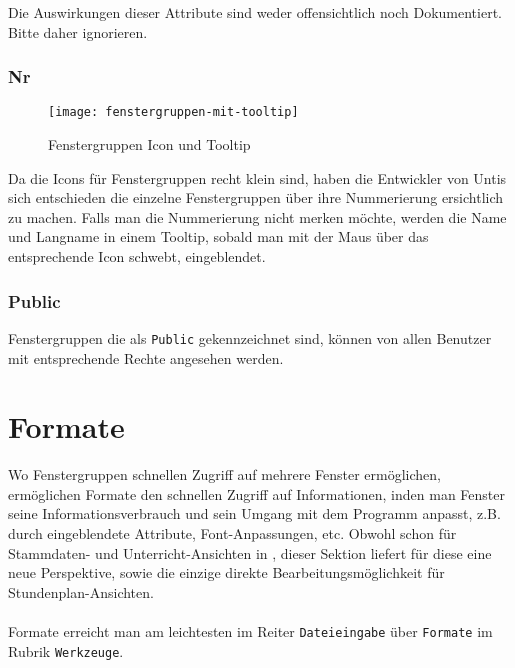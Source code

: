 Die Auswirkungen dieser Attribute sind weder offensichtlich noch Dokumentiert. Bitte daher ignorieren.

\subsubsection{Nr}

\begin{wrapfigure}{r}{.4\textwidth}
	\vspace{-14pt}
	\texttt{[image: fenstergruppen-mit-tooltip]}
	\vspace{-5pt}
	\caption{Fenstergruppen Icon und Tooltip}
	\label{fig:fenstergruppen-mit-tooltip}
	\vspace{-24pt}
\end{wrapfigure}

Da die Icons für Fenstergruppen recht klein sind, haben die Entwickler von Untis sich entschieden die einzelne Fenstergruppen über ihre Nummerierung ersichtlich zu machen. Falls man die Nummerierung nicht merken möchte, werden die Name und Langname in einem Tooltip, sobald man mit der Maus über das entsprechende Icon schwebt, eingeblendet.

\subsubsection{Public}

Fenstergruppen die als \texttt{Public} gekennzeichnet sind, können von allen Benutzer mit entsprechende Rechte angesehen werden.

\section{Formate}
\label{sec:formate}

Wo Fenstergruppen schnellen Zugriff auf mehrere Fenster ermöglichen, ermöglichen Formate den schnellen Zugriff auf Informationen, inden man Fenster seine Informationsverbrauch und sein Umgang mit dem Programm anpasst, z.B. durch eingeblendete Attribute, Font-Anpassungen, etc. Obwohl schon für Stammdaten- und Unterricht-Ansichten in 
, dieser Sektion liefert für diese eine neue Perspektive, sowie die einzige direkte Bearbeitungsmöglichkeit für Stundenplan-Ansichten.\\
\\
Formate erreicht man am leichtesten im Reiter \texttt{Dateieingabe} über \texttt{Formate} im Rubrik \texttt{Werkzeuge}.\\

